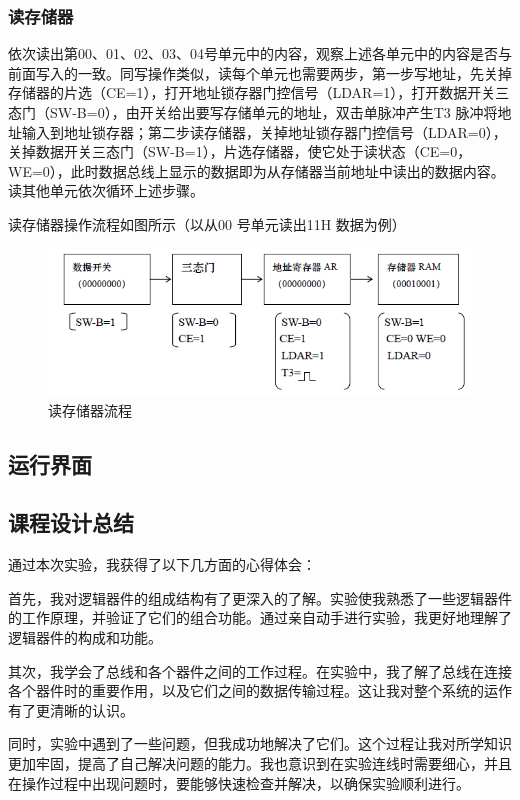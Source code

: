 \documentclass[UTF8,12pt]{article}
\begin{document}
\subsubsection{读存储器}
依次读出第00、01、02、03、04号单元中的内容，观察上述各单元中的内容是否与前面写入的一致。同写操作类似，读每个单元也需要两步，第一步写地址，先关掉存储器的片选（CE=1），打开地址锁存器门控信号（LDAR=1），打开数据开关三态门（SW-B=0），由开关给出要写存储单元的地址，双击单脉冲产生T3 脉冲将地址输入到地址锁存器；第二步读存储器，关掉地址锁存器门控信号（LDAR=0），关掉数据开关三态门（SW-B=1），片选存储器，使它处于读状态（CE=0，WE=0），此时数据总线上显示的数据即为从存储器当前地址中读出的数据内容。读其他单元依次循环上述步骤。

读存储器操作流程如图所示（以从00 号单元读出11H 数据为例）

\begin{figure}[htbp]
    \centering
    \includegraphics[width=1.0\textwidth]{img/18.png}
    \caption{读存储器流程}
\end{figure}

\newpage

\subsection{运行界面}


\subsection{课程设计总结}
通过本次实验，我获得了以下几方面的心得体会：

首先，我对逻辑器件的组成结构有了更深入的了解。实验使我熟悉了一些逻辑器件的工作原理，并验证了它们的组合功能。通过亲自动手进行实验，我更好地理解了逻辑器件的构成和功能。

其次，我学会了总线和各个器件之间的工作过程。在实验中，我了解了总线在连接各个器件时的重要作用，以及它们之间的数据传输过程。这让我对整个系统的运作有了更清晰的认识。

同时，实验中遇到了一些问题，但我成功地解决了它们。这个过程让我对所学知识更加牢固，提高了自己解决问题的能力。我也意识到在实验连线时需要细心，并且在操作过程中出现问题时，要能够快速检查并解决，以确保实验顺利进行。
\end{document}
